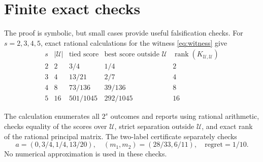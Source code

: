 \section{Finite exact checks}
\label{app:checks}

The proof is symbolic, but small cases provide useful falsification checks.
For $s=2,3,4,5$, exact rational calculations for the witness
\eqref{eq:witness} give
\[
\begin{array}{c|cccc}
s & |\mathcal U| & \text{tied score} & \text{best score outside }\mathcal U
  & \operatorname{rank}(K_{\mathcal U,\mathcal U})\\ \hline
2&2&3/4&1/4&2\\
3&4&13/21&2/7&4\\
4&8&73/136&39/136&8\\
5&16&501/1045&292/1045&16
\end{array}
\tag{48}\label{eq:smallchecks}
\]

The calculation enumerates all $2^s$ outcomes and reports using rational
arithmetic, checks equality of the scores over $\mathcal U$, strict
separation outside $\mathcal U$, and exact rank of the rational principal
matrix. The two-label certificate separately checks
\[
 a=(0,3/4,1/4,13/20),\quad
 (m_1,m_2)=(28/33,6/11),\quad
 \text{regret}=1/10.
\]
No numerical approximation is used in these checks.

